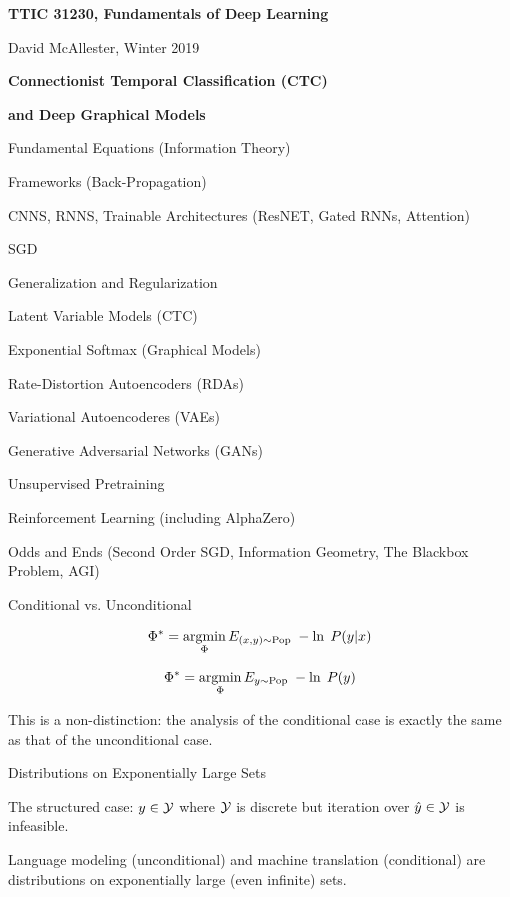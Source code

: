 




{\Huge

  \centerline{\bf TTIC 31230, Fundamentals of Deep Learning}
  \bigskip
  \centerline{David McAllester, Winter 2019}
  \vfill
  \centerline{\bf Connectionist Temporal Classification (CTC)}
  \vfill
  \centerline{\bf and Deep Graphical Models}
\vfill
\vfill
\vfill
{}

Fundamental Equations (Information Theory)

\vfill
Frameworks (Back-Propagation)

\vfill
CNNS, RNNS,  Trainable Architectures (ResNET, Gated RNNs, Attention)

\vfill
SGD

\vfill
Generalization and Regularization


Latent Variable Models (CTC)

\vfill
Exponential Softmax (Graphical Models)

\vfill
Rate-Distortion Autoencoders (RDAs)

\vfill
Variational Autoencoderes (VAEs)

\vfill
Generative Adversarial Networks (GANs)

\vfill
Unsupervised Pretraining

\vfill
Reinforcement Learning (including AlphaZero)

\vfill
Odds and Ends (Second Order SGD, Information Geometry, The Blackbox Problem, AGI)

{Conditional vs. Unconditional}

\vfill
{\color{red}
$$\Phi^* = \operatorname*{argmin}_\Phi E_{(x,y) \sim \mathrm{Pop}}\;-\ln \;P(y|x)$$

\vfill
$$\Phi^* = \operatorname*{argmin}_\Phi E_{y \sim \mathrm{Pop}}\;-\ln \;P(y)$$
}

\vfill
This is a non-distinction: the analysis of the conditional case
is exactly the same as that of the unconditional case.

{Distributions on Exponentially Large Sets}

{\color{red} The structured case:} $y \in {\cal Y}$ where ${\cal Y}$ is discrete but {\color{red} iteration over $\hat{y} \in {\cal Y}$ is infeasible}.

\vfill
{\color{red} Language modeling} (unconditional) and {\color{red} machine translation} (conditional) are distributions on exponentially large (even infinite) sets.

}
